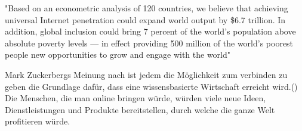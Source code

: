 \documentclass{article}
\begin{document}
"Based on an econometric analysis of 120 countries, we believe that achieving universal Internet penetration could expand world output by \$6.7 trillion.  
In addition, global inclusion could bring 7 percent of the world’s population above absolute poverty levels — in effect providing 500 
million of the world’s poorest people new opportunities to grow and engage with the world"
\parencite{connectWorld}

\medskip

Mark Zuckerbergs Meinung nach ist jedem die Möglichkeit zum verbinden zu geben die Grundlage dafür, dass eine wissensbasierte Wirtschaft erreicht wird.(\cite{HumanRight})
Die Menschen, die man online bringen würde, würden viele neue Ideen, Dienstleistungen und Produkte bereitstellen, durch welche die ganze Welt profitieren würde.
\end{document}
